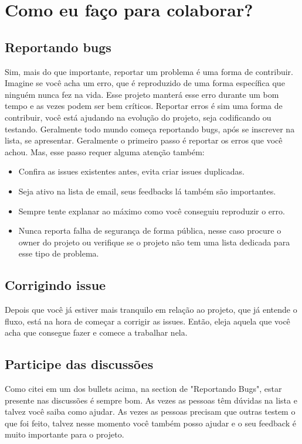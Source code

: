 \documentclass[a4paper,11pt]{article}
\begin{document}
\section{Como eu faço para colaborar?}
\subsection{Reportando bugs}
Sim, mais do que importante, reportar um problema é uma forma de contribuir. Imagine se você acha um erro, que é reproduzido de uma forma específica que ninguém nunca fez na vida. Esse projeto manterá esse erro durante um bom tempo e as vezes podem ser bem críticos. Reportar erros é sim uma forma de contribuir, você está ajudando na evolução do projeto, seja codificando ou testando.\newline\newline
Geralmente todo mundo começa reportando bugs, após se inscrever na lista, se apresentar. Geralmente o primeiro passo é reportar os erros que você achou. Mas, esse passo requer alguma atenção também:
\begin{itemize}
  \item Confira as issues existentes antes, evita criar issues duplicadas.
  \item Seja ativo na lista de email, seus feedbacks lá também são importantes.
  \item Sempre tente explanar ao máximo como você conseguiu reproduzir o erro.
  \item Nunca reporta falha de segurança de forma pública, nesse caso procure o owner do projeto ou verifique se o projeto não tem uma lista dedicada para esse tipo de problema.
\end{itemize}
\subsection{Corrigindo issue}
Depois que você já estiver mais tranquilo em relação ao projeto, que já entende o fluxo, está na hora de começar a corrigir as issues. Então, eleja aquela que você acha que consegue fazer e comece a trabalhar nela.
\subsection{Participe das discussões}
Como citei em um dos bullets acima, na section de "Reportando Bugs", estar presente nas discussões é sempre bom. As vezes as pessoas têm dúvidas na lista e talvez você saiba como ajudar. As vezes as pessoas precisam que outras testem o que foi feito, talvez nesse momento você também posso ajudar e o seu feedback é muito importante para o projeto.
\end{document}

